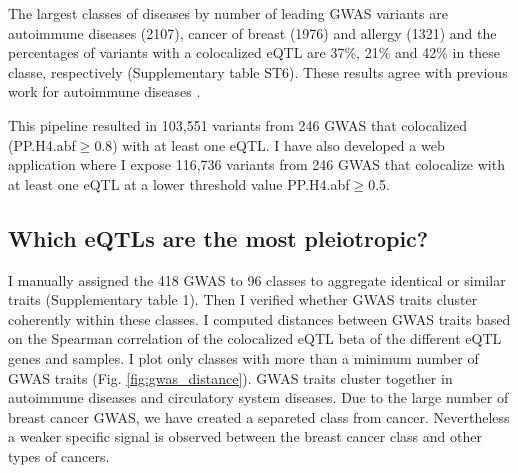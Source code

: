 The largest classes of diseases by number of leading GWAS variants are autoimmune diseases (2107), cancer of breast (1976) and allergy (1321)
%
and the percentages of variants with a colocalized eQTL are 37\%, 21\% and 42\% in these classe, respectively (Supplementary table ST6).
%
%
These results agree with previous work for autoimmune diseases \citep{2021.Li.Mu}.

This pipeline resulted in 103,551 variants from 246 GWAS that colocalized (PP.H4.abf$\geq$0.8) with at least one eQTL.
%
I have also developed a web application where I expose 116,736 variants from 246 GWAS that colocalize with at least one eQTL at a lower threshold value PP.H4.abf$\geq$0.5.


\subsection*{Which eQTLs are the most pleiotropic?}

I manually assigned the 418 GWAS to 96 classes to aggregate identical or similar traits (Supplementary table 1).
%
Then I verified whether GWAS traits cluster coherently within these classes.
%
I computed distances between GWAS traits based on the Spearman correlation of the colocalized eQTL beta of the different eQTL genes and samples.
%
I plot only classes with more than a minimum number of GWAS traits (Fig. \ref{fig:gwas_distance}).
%
GWAS traits cluster together in autoimmune diseases and circulatory system diseases.
%
Due to the large number of breast cancer GWAS, we have created a separeted class from cancer.
Nevertheless a weaker specific signal is observed between the breast cancer class and other types of cancers.

